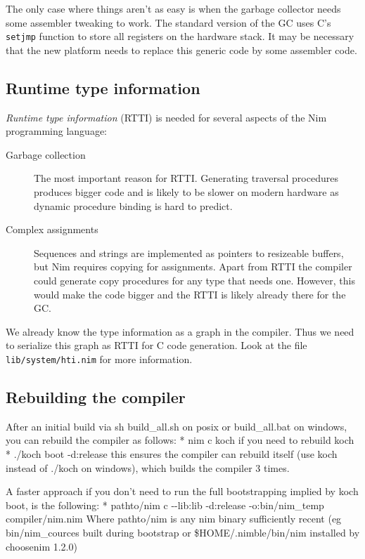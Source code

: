 The only case where things aren't as easy is when the garbage collector
needs some assembler tweaking to work. The standard version of the GC
uses C's \texttt{setjmp} function to store all registers on the hardware
stack. It may be necessary that the new platform needs to replace this
generic code by some assembler code.

\hypertarget{runtime-type-information}{%
\subsection{Runtime type information}\label{runtime-type-information}}

\emph{Runtime type information} (RTTI) is needed for several aspects of
the Nim programming language:

\begin{description}
\item[Garbage collection]
The most important reason for RTTI. Generating traversal procedures
produces bigger code and is likely to be slower on modern hardware as
dynamic procedure binding is hard to predict.
\item[Complex assignments]
Sequences and strings are implemented as pointers to resizeable buffers,
but Nim requires copying for assignments. Apart from RTTI the compiler
could generate copy procedures for any type that needs one. However,
this would make the code bigger and the RTTI is likely already there for
the GC.
\end{description}

We already know the type information as a graph in the compiler. Thus we
need to serialize this graph as RTTI for C code generation. Look at the
file \texttt{lib/system/hti.nim} for more information.

\hypertarget{rebuilding-the-compiler}{%
\subsection{Rebuilding the compiler}\label{rebuilding-the-compiler}}

After an initial build via {sh build\_all.sh} on posix or
{build\_all.bat} on windows, you can rebuild the compiler as follows: *
{nim c koch} if you need to rebuild koch * {./koch boot -d:release} this
ensures the compiler can rebuild itself (use {koch} instead of {./koch}
on windows), which builds the compiler 3 times.

A faster approach if you don't need to run the full bootstrapping
implied by {koch boot}, is the following: * {pathto/nim c -\/-lib:lib
-d:release -o:bin/nim\_temp compiler/nim.nim} Where {pathto/nim} is any
nim binary sufficiently recent (eg {bin/nim\_cources} built during
bootstrap or {\$HOME/.nimble/bin/nim} installed by {choosenim 1.2.0})

